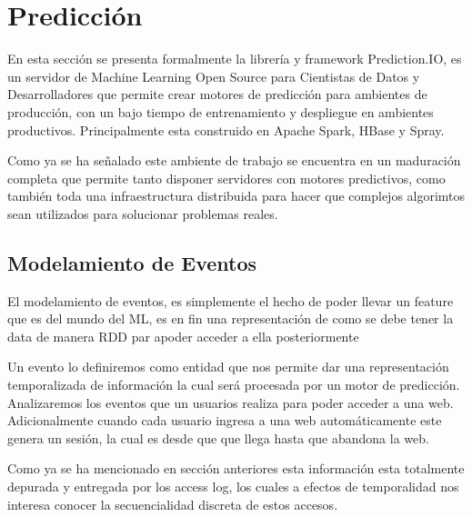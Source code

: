 

\section{Predicción }

  	
  En esta sección se presenta formalmente la librería y framework Prediction.IO, %
  es un servidor de Machine Learning Open Source para Cientistas de Datos y Desarrolladores que permite
  crear motores de predicción para ambientes de producción, con un bajo tiempo de entrenamiento y despliegue en ambientes productivos. Principalmente esta construido en Apache Spark, HBase y Spray.

  Como ya se ha señalado este ambiente de trabajo se encuentra en un maduración completa que permite tanto disponer
  servidores con motores predictivos, como también toda una infraestructura distribuida para hacer que complejos algorimtos sean utilizados para solucionar problemas reales.




  \subsection{Modelamiento de Eventos}


El modelamiento de eventos, es simplemente el hecho de poder llevar un feature  que es del mundo del ML, es en fin una representación de como se debe tener la data de manera RDD par apoder acceder a ella posteriormente 

Un evento lo definiremos como entidad que nos permite dar una representación temporalizada de información la cual será procesada por un motor de predicción. Analizaremos los eventos que un usuarios realiza para poder acceder a una web. Adicionalmente cuando cada usuario ingresa a una web automáticamente este genera un sesión, la cual es desde que que llega hasta que abandona la web.

Como ya se ha mencionado en sección anteriores esta información esta totalmente depurada y entregada por los access log, los cuales a efectos de temporalidad nos interesa conocer la secuencialidad discreta de estos accesos.






